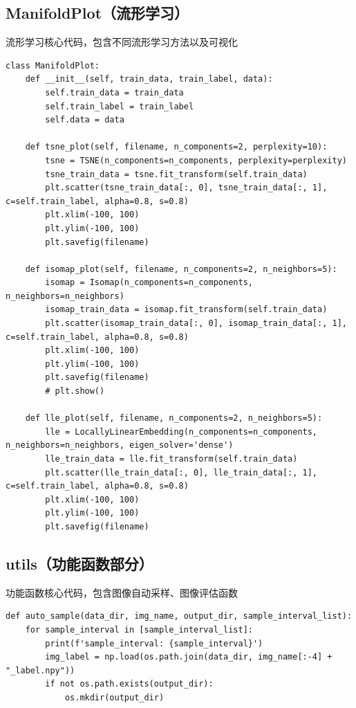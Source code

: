 \documentclass[12pt,hyperref,a4paper,UTF8]{ctexart}
\begin{document}
{{\subsection{ManifoldPlot（流形学习）}
流形学习核心代码，包含不同流形学习方法以及可视化
\begin{mdframed}[style=codebox]
\begin{lstlisting}
class ManifoldPlot:
    def __init__(self, train_data, train_label, data):
        self.train_data = train_data
        self.train_label = train_label
        self.data = data

    def tsne_plot(self, filename, n_components=2, perplexity=10):
        tsne = TSNE(n_components=n_components, perplexity=perplexity)
        tsne_train_data = tsne.fit_transform(self.train_data)
        plt.scatter(tsne_train_data[:, 0], tsne_train_data[:, 1], c=self.train_label, alpha=0.8, s=0.8)
        plt.xlim(-100, 100)
        plt.ylim(-100, 100)
        plt.savefig(filename)

    def isomap_plot(self, filename, n_components=2, n_neighbors=5):
        isomap = Isomap(n_components=n_components, n_neighbors=n_neighbors)
        isomap_train_data = isomap.fit_transform(self.train_data)
        plt.scatter(isomap_train_data[:, 0], isomap_train_data[:, 1], c=self.train_label, alpha=0.8, s=0.8)
        plt.xlim(-100, 100)
        plt.ylim(-100, 100)
        plt.savefig(filename)
        # plt.show()

    def lle_plot(self, filename, n_components=2, n_neighbors=5):
        lle = LocallyLinearEmbedding(n_components=n_components, n_neighbors=n_neighbors, eigen_solver='dense')
        lle_train_data = lle.fit_transform(self.train_data)
        plt.scatter(lle_train_data[:, 0], lle_train_data[:, 1], c=self.train_label, alpha=0.8, s=0.8)
        plt.xlim(-100, 100)
        plt.ylim(-100, 100)
        plt.savefig(filename)
\end{lstlisting}
\end{mdframed}

\subsection{utils（功能函数部分）}
功能函数核心代码，包含图像自动采样、图像评估函数
\begin{mdframed}[style=codebox]
\begin{lstlisting}
def auto_sample(data_dir, img_name, output_dir, sample_interval_list):
    for sample_interval in [sample_interval_list]:
        print(f'sample_interval: {sample_interval}')
        img_label = np.load(os.path.join(data_dir, img_name[:-4] + "_label.npy"))
        if not os.path.exists(output_dir):
            os.mkdir(output_dir)


\end{lstlisting}
\end{mdframed}}}
\end{document}
